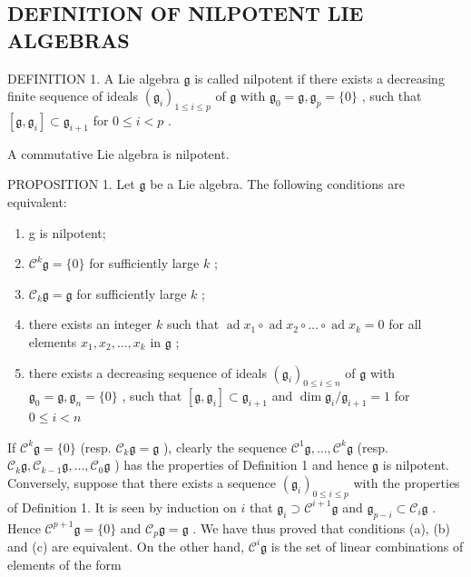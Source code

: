\subsection{DEFINITION OF NILPOTENT LIE ALGEBRAS}

DEFINITION 1. A Lie algebra \(\mathfrak{g}\) is called nilpotent if there exists a decreasing finite sequence of ideals \((\mathfrak{g}_i)_{1\leqslant i\leqslant p}\) of \(\mathfrak{g}\) with \(\mathfrak{g}_0 = \mathfrak{g},\mathfrak{g}_p = \{0\}\) , such that \([\mathfrak{g},\mathfrak{g}_i]\subset \mathfrak{g}_{i + 1}\) for \(0\leqslant i < p\) .

A commutative Lie algebra is nilpotent.

PROPOSITION 1. Let \(\mathfrak{g}\) be a Lie algebra. The following conditions are equivalent:

\begin{enumerate}
\def\labelenumi{(\alph{enumi})}
\item
  g is nilpotent;
\item
  \(\mathcal{C}^k\mathfrak{g} = \{0\}\) for sufficiently large \(k\) ;
\item
  \(\mathcal{C}_k\mathfrak{g} = \mathfrak{g}\) for sufficiently large \(k\) ;
\item
  there exists an integer \(k\) such that \(\operatorname{ad} x_1 \circ \operatorname{ad} x_2 \circ \dots \circ \operatorname{ad} x_k = 0\) for all elements \(x_1, x_2, \ldots, x_k\) in \(\mathfrak{g}\) ;
\item
  there exists a decreasing sequence of ideals \((\mathfrak{g}_i)_{0\leqslant i\leqslant n}\) of \(\mathfrak{g}\) with \(\mathfrak{g}_0 = \mathfrak{g},\mathfrak{g}_n = \{0\}\) , such that \([\mathfrak{g},\mathfrak{g}_i]\subset \mathfrak{g}_{i + 1}\) and \(\dim \mathfrak{g}_i / \mathfrak{g}_{i + 1} = 1\) for \(0\leqslant i <   n\)
\end{enumerate}

If \(\mathcal{C}^k\mathfrak{g} = \{0\}\) (resp. \(\mathcal{C}_k\mathfrak{g} = \mathfrak{g}\) ), clearly the sequence \(\mathcal{C}^1\mathfrak{g},\ldots ,\mathcal{C}^k\mathfrak{g}\) (resp. \(\mathcal{C}_k\mathfrak{g},\mathcal{C}_{k - 1}\mathfrak{g},\ldots ,\mathcal{C}_0\mathfrak{g}\) ) has the properties of Definition 1 and hence \(\mathfrak{g}\) is nilpotent. Conversely, suppose that there exists a sequence \((\mathfrak{g}_i)_{0\leqslant i\leqslant p}\) with the properties of Definition 1. It is seen by induction on \(i\) that \(\mathfrak{g}_i\supset \mathcal{C}^{i + 1}\mathfrak{g}\) and \(\mathfrak{g}_{p - i}\subset \mathcal{C}_i\mathfrak{g}\) . Hence \(\mathcal{C}^{p + 1}\mathfrak{g} = \{0\}\) and \(\mathcal{C}_p\mathfrak{g} = \mathfrak{g}\) . We have thus proved that conditions (a), (b) and (c) are equivalent. On the other hand, \(\mathcal{C}^i\mathfrak{g}\) is the set of linear combinations of elements of the form

